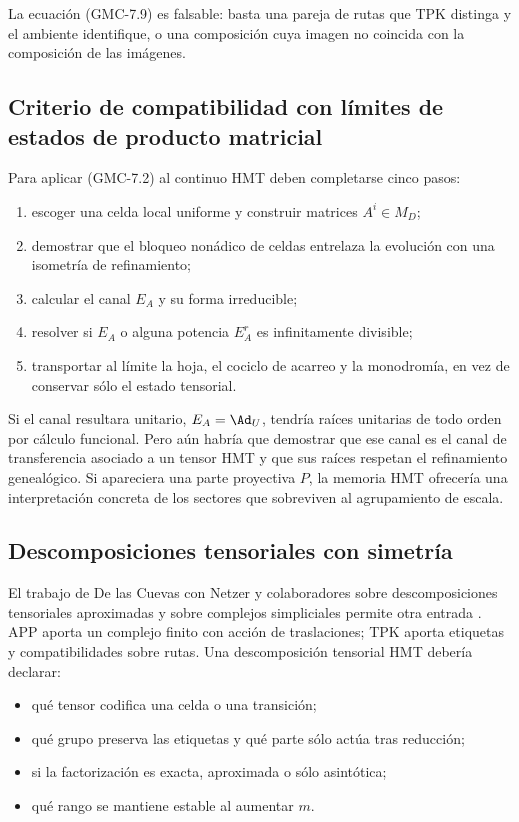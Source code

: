 La ecuación \textup{(GMC-7.9)} es falsable: basta una pareja de rutas que TPK
distinga y el ambiente identifique, o una composición cuya imagen no coincida
con la composición de las imágenes.

\subsection{Criterio de compatibilidad con límites de estados de producto matricial}

Para aplicar \textup{(GMC-7.2)} al continuo HMT deben completarse cinco pasos:

\begin{enumerate}
 \item escoger una celda local uniforme y construir matrices
 $A^i\in M_D$;
 \item demostrar que el bloqueo nonádico de celdas entrelaza la evolución
 con una isometría de refinamiento;
 \item calcular el canal $E_A$ y su forma irreducible;
 \item resolver si $E_A$ o alguna potencia $E_A^r$ es infinitamente
 divisible;
 \item transportar al límite la hoja, el cociclo de acarreo y la
 monodromía, en vez de conservar sólo el estado tensorial.
\end{enumerate}

Si el canal resultara unitario, $E_A=\Ad_U$, tendría raíces unitarias de todo
orden por cálculo funcional. Pero aún habría que demostrar que ese canal es
el canal de transferencia asociado a un tensor HMT y que sus raíces respetan el refinamiento
genealógico. Si apareciera una parte proyectiva $P$, la memoria HMT ofrecería
una interpretación concreta de los sectores que sobreviven al agrupamiento
de escala.

\subsection{Descomposiciones tensoriales con simetría}

El trabajo de De las Cuevas con Netzer y colaboradores sobre
descomposiciones tensoriales aproximadas y sobre complejos simpliciales
permite otra entrada \citep{delascuevas2021approximate,
delascuevas2024simplicial}. APP aporta un complejo finito con acción de
traslaciones; TPK aporta etiquetas y compatibilidades sobre rutas. Una
descomposición tensorial HMT debería declarar:

\begin{itemize}
 \item qué tensor codifica una celda o una transición;
 \item qué grupo preserva las etiquetas y qué parte sólo actúa tras
 reducción;
 \item si la factorización es exacta, aproximada o sólo asintótica;
 \item qué rango se mantiene estable al aumentar $m$.
\end{itemize}

